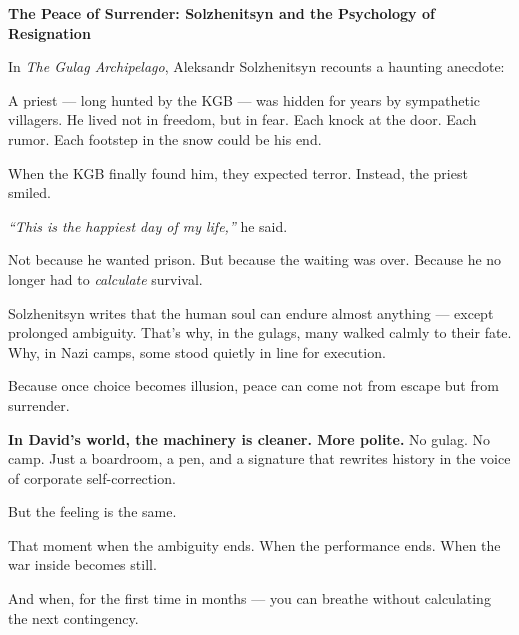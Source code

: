 \begin{HistoricalSidebar}{\textbf{The Peace of Surrender: Solzhenitsyn and the Psychology of Resignation}}

    In \textit{The Gulag Archipelago}, Aleksandr Solzhenitsyn recounts a haunting anecdote:  

    \medskip
    
    A priest — long hunted by the KGB — was hidden for years by sympathetic villagers. He lived 
    not in freedom, but in fear.  
    Each knock at the door. Each rumor. Each footstep in the snow could be his end.  

    \medskip
    
    When the KGB finally found him, they expected terror.  
    Instead, the priest smiled.

    \medskip
    
    \textit{“This is the happiest day of my life,”} he said.

    \medskip
    
    Not because he wanted prison.  
    But because the waiting was over.  
    Because he no longer had to \textit{calculate} survival.  

    \medskip
    
    Solzhenitsyn writes that the human soul can endure almost anything — except prolonged ambiguity.  
    That’s why, in the gulags, many walked calmly to their fate.  
    Why, in Nazi camps, some stood quietly in line for execution.

    \medskip
    
    Because once choice becomes illusion, peace can come not from escape but from surrender.
    
    \medskip
    
    \textbf{In David’s world, the machinery is cleaner. More polite.}  
    No gulag. No camp.  
    Just a boardroom, a pen, and a signature that rewrites history in the voice of corporate 
    self-correction.

    \medskip
    
    But the feeling is the same.

    \medskip
    
    That moment when the ambiguity ends.  
    When the performance ends.  
    When the war inside becomes still.

    \medskip
    
    And when, for the first time in months —  
    you can breathe without calculating the next contingency.
    
\end{HistoricalSidebar}
    